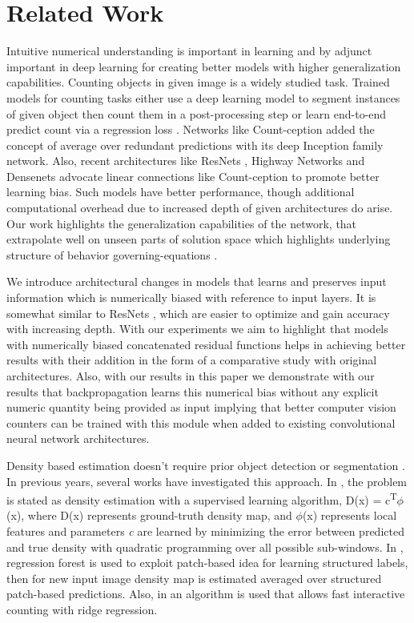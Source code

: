 \documentclass[conference]{IEEEtran}
\begin{document}
\section{Related Work}

Intuitive numerical understanding is important in learning and by adjunct important in deep learning \cite{b1} for creating better models with higher generalization capabilities. Counting objects \cite{b12, b13, b14, b15, b16} in given image is a widely studied task. Trained models for counting tasks either use a deep learning model to segment instances of given object then count them in a post-processing step \cite{b17} or learn end-to-end predict count via a regression loss \cite{b4}.  Networks like Count-ception \cite{b18} added the concept of average over redundant predictions with its deep Inception family network.  Also, recent architectures like ResNets \cite{b19}, Highway Networks \cite{b20} and Densenets \cite{b21} advocate linear connections like Count-ception to promote better learning bias. Such models have better performance, though additional computational overhead due to increased depth of given architectures do arise. Our work highlights the generalization capabilities of the network, that extrapolate well on unseen parts of solution space which highlights underlying structure of behavior governing-equations \cite{b22}.

 We introduce architectural changes in models that learns and preserves input information which is numerically biased with reference to input layers. It is somewhat similar to ResNets \cite{b9}, which are easier to optimize and gain accuracy with increasing depth. With our experiments we aim to highlight that models with numerically biased concatenated residual functions helps in achieving better results with their addition in the form of a comparative study with original architectures. Also, with our results in this paper we demonstrate with our results that backpropagation learns this numerical bias without any explicit numeric quantity being provided as input implying that better computer vision counters can be trained with this module when added to existing convolutional neural network architectures.

Density based estimation doesn’t require prior object detection or segmentation \cite{b15, b12, b23}. In previous years, several works have investigated this approach. In \cite{b15}, the problem is stated as density estimation with a supervised learning algorithm, D(x) = c\textsuperscript{T}$\phi$(x), where D(x) represents  ground-truth density map, and $\phi$(x) represents  local features and parameters \textit{c} are learned by minimizing the error between predicted and true density with quadratic programming over all possible sub-windows. In \cite{b23}, regression forest is used to exploit patch-based idea for learning structured labels, then for new input image density map is estimated averaged over structured patch-based predictions. Also, in \cite{b12} an algorithm is used that allows fast interactive counting with ridge regression. 
\end{document}
